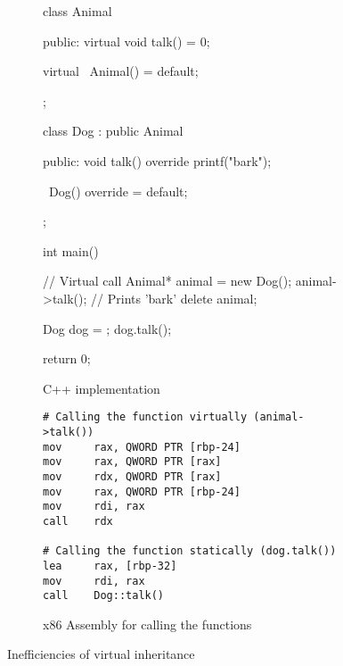 \begin{figure}[ht]
    \centering
    \begin{subfigure}{0.49\linewidth}%
        \begin{cppcode}
class Animal {
public:
    virtual void talk() = 0;

    virtual ~Animal() = default;
};

class Dog : public Animal {
public:
    void talk() override {
        printf("bark\n");
    }

    ~Dog() override = default;
};

int main() {
    // Virtual call
    Animal* animal = new Dog();
    animal->talk(); // Prints 'bark'
    delete animal;

    Dog dog = {};
    dog.talk();

    return 0;
}
        \end{cppcode}
        \caption{C++ implementation}
    \end{subfigure}%
    \begin{subfigure}{0.49\linewidth}%
        \begin{verbatim}
# Calling the function virtually (animal->talk())
mov     rax, QWORD PTR [rbp-24]
mov     rax, QWORD PTR [rax]
mov     rdx, QWORD PTR [rax]
mov     rax, QWORD PTR [rbp-24]
mov     rdi, rax
call    rdx
        
# Calling the function statically (dog.talk())
lea     rax, [rbp-32]
mov     rdi, rax
call    Dog::talk()
        \end{verbatim}
        \caption{x86 Assembly for calling the functions}
    \end{subfigure}%
    \caption{Inefficiencies of virtual inheritance}
    \label{fig:virtual_inheritance}
\end{figure}